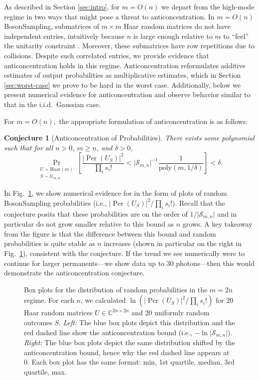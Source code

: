 \documentclass[11pt]{article}
\theoremstyle{plain}
\theoremstyle{plain}
\theoremstyle{plain}
\theoremstyle{plain}
\theoremstyle{plain}
\theoremstyle{plain}
\theoremstyle{plain}
\theoremstyle{remark}
\theoremstyle{remark}
\theoremstyle{plain}
\theoremstyle{plain}
\newtheorem{conj}{Conjecture}
\theoremstyle{plain}
\theoremstyle{plain}
\newcommand{\Per}{\operatorname{Per}}
\newcommand{\Haar}{\mathrm{Haar}}
\newcommand{\Smn}{\mathcal{S}_{m,n}}
\newcommand\poly[1]{\mathrm{poly}(#1)}
\begin{document}
As described in Section \ref{sec:intro}, for $m=O(n)$ we depart from the high-mode regime in two ways that might pose a threat to anticoncentration. 
In $m=O(n)$ BosonSampling, submatrices of $m\times m$ Haar random matrices do not have independent entries, intuitively because $n$ is large enough relative to $m$ to ``feel'' the unitarity constraint \cite{jiang2006many}. Moreover, these submatrices have row repetitions due to collisions. 
Despite such correlated entries, we provide evidence that anticoncentration holds in this regime. Anticoncentration reformulates additive estimates of output probabilities as multiplicative estimates, which in Section 
\ref{sec:worst-case} we prove to be hard in the worst case.
Additionally, below we present numerical evidence for anticoncentration and observe behavior similar to that in the i.i.d.\ Gaussian case.

For $m=O(n),$ the appropriate formulation of anticoncentration is as follows:

\begin{conj}[Anticoncentration of Probabilities]
\label{conj:anticoncentration_probs}
There exists some polynomial such that for all $n > 0$, $m \ge n$, and $\delta > 0$,
$$
\Pr_{\substack{U \sim \Haar(m) \\ S \sim \mathcal U_{m,n}}} \left[ \frac{|\Per(U_S)|^2}{\prod_i s_i!} < \vert\Smn\vert^{-1} \frac{1}{\poly{m, 1/\delta}} \right] < \delta.
$$
\end{conj}

In Fig.~\ref{fig:anticoncentration}, we show numerical evidence for  in the form of plots of random BosonSampling probabilities (i.e., $|\Per(U_S)|^2/\prod_i s_i!$). 
Recall that the conjecture posits that these probabilities are on the order of $1/\vert\Smn\vert$ and in particular do not grow smaller relative to this bound as $n$ grows. 
A key takeaway from the figure is that the difference between this bound and random probabilities is quite stable as $n$ increases (shown in particular on the right in Fig.~\ref{fig:anticoncentration}), consistent with the conjecture. If the trend we see numerically were to continue for larger permanents---we show data up to  30 photons---then this would demonstrate the anticoncentration conjecture.

\begin{figure}
\centering
    
    
\caption{Box plots for the distribution of random probabilities in the $m = 2n$ regime. For each $n$, we calculated $\ln(|\Per(U_S)|^2/\prod_i s_i!)$ for 20  Haar random matrices $U \in \mathbb C^{2n \times 2n}$ and 20 uniformly random outcomes $S$. \textit{Left:} The blue box plots depict this distribution and the red dashed line show the anticoncentration bound (i.e., $- \ln \vert\Smn\vert$).
\textit{Right:} The blue box plots depict the same distribution shifted by the anticoncentration bound, hence why the red dashed line appears at $0$. Each box plot has the same format: min, 1st quartile, median, 3rd quartile, max.}
\label{fig:anticoncentration}
\end{figure}
\end{document}
